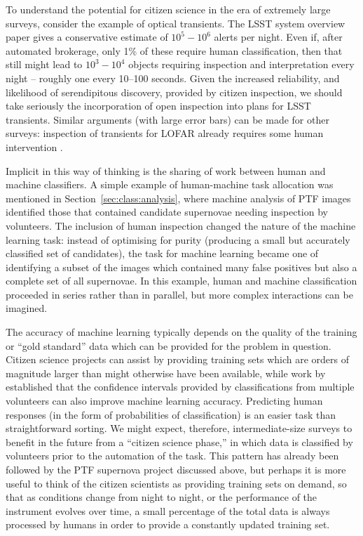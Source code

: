 \documentclass{ar2e}
\def\Sref#1{Section~\ref{#1}\xspace}
\begin{document}
To understand the potential for citizen science in the era of extremely large
surveys, consider the example of optical transients. The LSST system overview
paper \citep{LSSTsystem} gives a conservative estimate of $10^5-10^6$ alerts
per night. Even if, after automated brokerage, only 1\% of these require human
classification, then that still might lead to $10^3-10^4$ objects requiring
inspection and interpretation every night -- roughly one every 10--100
seconds. Given the increased reliability, and likelihood of serendipitous
discovery, provided by citizen inspection, we should take seriously the
incorporation of open inspection into plans for LSST transients. Similar
arguments (with large error bars) can be made for other surveys: inspection of
transients for LOFAR already requires some human intervention \citep{LOFAR}. 

Implicit in this way of thinking is the sharing of work between human and
machine classifiers.  A simple example of human-machine task allocation was
mentioned in \Sref{sec:class:analysis}, where machine analysis of PTF images
identified those that contained candidate supernovae needing inspection by
volunteers. The inclusion of human inspection changed the nature of the
machine learning task: instead of optimising for purity (producing a small but
accurately classified set of candidates), the task for machine learning became
one of identifying a subset of the images which contained many false positives
but also a complete set of all supernovae.  In this example, human and machine
classification proceeded in series rather than in parallel, but more complex
interactions can be imagined. 

The accuracy of machine learning typically depends on the quality of the
training or ``gold standard'' data which can be provided for the problem in
question. Citizen science projects can assist by providing training sets which
are orders of magnitude larger than might otherwise have been available, while
work by \citet{Banerji++2010} established that the confidence intervals
provided by classifications from multiple volunteers can also improve machine
learning accuracy.  Predicting human responses (in the form of probabilities
of classification) is an easier task than straightforward sorting. We might
expect, therefore, intermediate-size surveys to benefit in the future from a
``citizen science phase,'' in which data is classified by volunteers prior to
the automation of the task. This pattern has already been followed by the PTF
supernova project discussed above, but perhaps it is more useful to think of
the citizen scientists as providing training sets on demand, so that as
conditions change from night to night, or the performance of the instrument
evolves over time, a small percentage of the total data is always processed by
humans in order to provide a constantly updated training set. 
\end{document}
